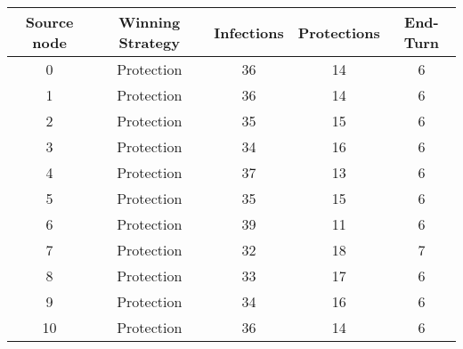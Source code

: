 \documentclass[results.tex]{subfiles}
\begin{document}
    \begin{center}
        \begin{tabular}{| c || c | c | c | c |}
            \hline
            {\bfseries Source node} & {\bfseries Winning Strategy} & {\bfseries Infections} & {\bfseries Protections}
            & {\bfseries End-Turn}
            \\  %
            \hline\hline
            0                       & Protection                   & 36                     & 14                      & 6                    \\
            \hline
            1                       & Protection                   & 36                     & 14                      & 6                    \\
            \hline
            2                       & Protection                   & 35                     & 15                      & 6                    \\
            \hline
            3                       & Protection                   & 34                     & 16                      & 6                    \\
            \hline
            4                       & Protection                   & 37                     & 13                      & 6                    \\
            \hline
            5                       & Protection                   & 35                     & 15                      & 6                    \\
            \hline
            6                       & Protection                   & 39                     & 11                      & 6                    \\
            \hline
            7                       & Protection                   & 32                     & 18                      & 7                    \\
            \hline
            8                       & Protection                   & 33                     & 17                      & 6                    \\
            \hline
            9                       & Protection                   & 34                     & 16                      & 6                    \\
            \hline
            10                      & Protection                   & 36                     & 14                      & 6                    \\

\end{tabular}
\end{center}
\end{document}
